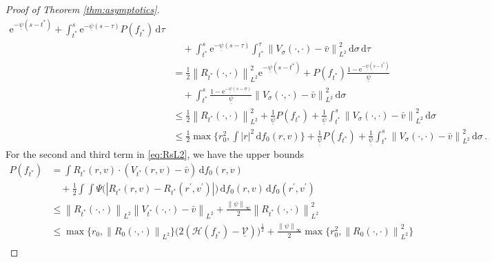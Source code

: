 \documentclass[11pt]{article}
\newcommand{\norm}[1]{\left\| #1 \right\|}
\newcommand{\abs}[1]{\left| #1 \right|}
\newcommand{\msolinit}[1]{f_0(#1)}
\newcommand{\charX}[2]{R_{#1}(#2) }
\newcommand{\charV}[2]{V_{#1}(#2)}
\newcommand{\Pfunc}{P}
\begin{document}
\begin{bibunit}[unsrtnat]
\begin{proof}[Proof of Theorem \ref{thm:asymptotics}]
\begin{align}
            \mathrm{e}^{-\underline{\psi} (s-t^*)} 
            + \int_{t^*}^{s} \mathrm{e}^{-\underline{\psi} (s-\tau)} \Pfunc (f_{t^*}) \, \mathrm{d}\tau \nonumber \\
            &\quad + \int_{t^*}^{s} \mathrm{e}^{-\underline{\psi} (s-\tau)} \int_{t^{*}}^{\tau} \norm{ \charV{\sigma}{\cdot,\cdot} - \bar{v}}^{2}_{L^{2}} \, \mathrm{d}\sigma \, \mathrm{d}\tau \nonumber \\
            &= \frac{1}{2} \norm{\charX{t^*}{\cdot, \cdot} }_{L^{2}}^{2} \mathrm{e}^{-\underline{\psi} (s-t^*)}
            + \Pfunc (f_{t^*}) \frac{1-\mathrm{e}^{-\underline{\psi}(s-t^*) }}{\underline{\psi}} \nonumber \\ 
            &\quad +  \int_{t^*}^{s} \frac{1-\mathrm{e}^{-\underline{\psi}(s-\sigma) }}{\underline{\psi}} \norm{\charV{\sigma}{\cdot,\cdot} - \bar{v}}^{2}_{L^{2}} \, \mathrm{d}\sigma \nonumber \\
            &\leq \frac{1}{2} \norm{\charX{t^*}{\cdot, \cdot} }_{L^{2}}^{2} + \frac{1}{\underline{\psi}} \Pfunc (f_{t^*}) + \frac{1}{\underline{\psi}} \int_{t^*}^{s} \norm{\charV{\sigma}{\cdot,\cdot} - \bar{v}}^{2}_{L^{2}} \, \mathrm{d}\sigma \nonumber \\
            &\leq \frac{1}{2} \max \Big\{ r_0^{2}, \int \abs{r}^2 \, \mathrm{d}\msolinit{r,v} \Big\} 
            + \frac{1}{\underline{\psi}} \Pfunc (f_{t^*}) + \frac{1}{\underline{\psi}} \int_{t^*}^{s} \norm{\charV{\sigma}{\cdot,\cdot} - \bar{v}}^{2}_{L^{2}} \, \mathrm{d}\sigma \label{eq:RsL2} \, .
        \end{align}
        For the second and third term in \eqref{eq:RsL2}, we have the upper bounds
        \begin{align}
            \Pfunc (f_{t^*}) &= \int \charX{t^*}{r,v}  \cdot ( \charV{t^*}{r,v} - \bar{v}) \, \mathrm{d}\msolinit{r,v} \nonumber \\
            &\quad + \frac{1}{2} \int \int  \Psi \big(\abs{ \charX{t^*}{r,v} - \charX{t^*}{r^\prime, v^\prime} } \big) \, \mathrm{d}\msolinit{r,v} \, \mathrm{d}\msolinit{r^\prime,v^\prime} \nonumber \\
            &\leq \norm{\charX{t^*}{\cdot, \cdot} }_{L^{2}}  \norm{\charV{t^*}{\cdot, \cdot} - \bar{v}}_{L^{2}} 
            + \frac{\norm{\psi}_\infty}{2} \norm{\charX{t^*}{\cdot, \cdot} }_{L^{2}}^{2} \nonumber \\
            &\leq \max \big\{ r_0, \norm{\charX{0}{\cdot, \cdot}}_{L^{2}} \big\} \big( 2 (\mathcal{H}(f_{t^*}) - \underline{\mathcal{V}}) \big)^{\frac{1}{2}} 
            + \frac{\norm{\psi}_\infty}{2} \max \big\{ r_0^{2}, \norm{\charX{0}{\cdot, \cdot}}_{L^{2}}^{2} \big\} \nonumber \\

\end{align}
\end{proof}
\end{bibunit}
\end{document}
